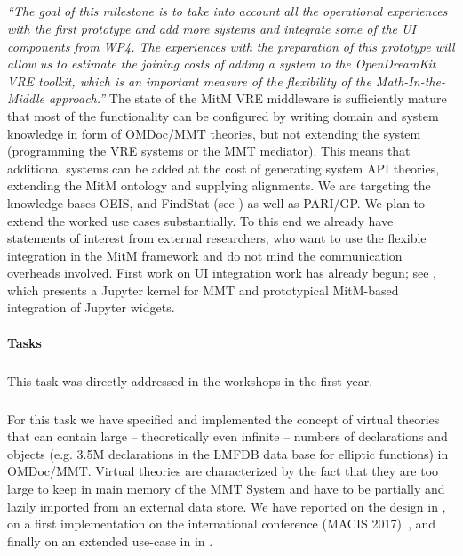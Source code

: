 \subparagraph{}
\emph{“The goal of this milestone is to take into account all the operational experiences with the first prototype and add more systems and integrate some of the UI components from WP4.
  The experiences with the preparation of this prototype will allow us to estimate the joining costs of adding a system to the OpenDreamKit VRE toolkit, which is an important measure of the flexibility of the Math-In-the-Middle approach.”}
The state of the MitM VRE middleware is sufficiently mature that most of the functionality can be configured by writing domain and system knowledge in form of OMDoc/MMT theories, but not extending the system (programming the VRE systems or the MMT mediator).
This means that additional systems can be added at the cost of generating system API theories, extending the  MitM ontology and supplying alignments.
We are targeting the knowledge bases OEIS, and FindStat (see ) as well as PARI/GP.
We plan to extend the worked use cases substantially.
To this end we already have statements of interest from external researchers, who want to use the flexible integration in the MitM framework and do not mind the communication overheads involved. 
First work on UI integration work has already begun; see  , which presents a Jupyter kernel for MMT and prototypical MitM-based integration of Jupyter widgets.

\paragraph{Tasks}
\medskip

\subparagraph{}
\label{dksbases@data-assessment}
This task was directly addressed in the  workshops in the first year.
\medskip

\subparagraph{}
\label{dksbases@data-triform}

For this task we have specified and implemented the concept of virtual theories that can contain large -- theoretically even infinite -- numbers of declarations and objects (e.g. 3.5M declarations in the LMFDB data base for elliptic functions) in OMDoc/MMT.
Virtual theories are characterized by the fact that they are too large to keep in main memory of the MMT System and have to be partially and lazily imported from an external data store.
We have reported on the design in , on a first implementation on the international conference (MACIS 2017)~\cite{WieKohRab:vtuimkb17}, and finally on an extended use-case in \LMFDB in . 
\medskip

